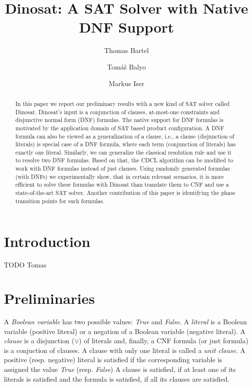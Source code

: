 \documentclass[a4paper,UKenglish,cleveref, autoref, thm-restate]{lipics-v2021}
\title{Dinosat: A SAT Solver with Native DNF Support}
\author{Thomas Bartel}{CAS Software, Karlsruhe, Germany} {thomas.bartel@cas.de}{}{}
\author{Tom\'a\v{s} Balyo}{CAS Software, Karlsruhe, Germany} {tomas.balyo@cas.de}{}{}
\author{Markus Iser}{Karlsruhe Institute of Technology, Karlsruhe, Germany} {markus.iser@kit.de}{}{}
\begin{document}
\maketitle

\begin{abstract}
In this paper we report our preliminary results with a new kind of SAT solver called Dinosat.
Dinosat's input is a conjunction of clauses, at-most-one constraints and disjunctive normal form (DNF) formulas. The native support for DNF formulas is motivated by the application domain of SAT based product configuration. A DNF formula can also be viewed as a generalization of a clause, i.e., a clause (disjunction of literals) is special case of a DNF formula, where each term (conjunction of literals) has exactly one literal. Similarly, we can generalize the classical resolution rule and use it to resolve two DNF formulas. Based on that, the CDCL algorithm can be modified to work with DNF formulas instead of just clauses. Using randomly generated formulas (with DNFs) we experimentally show, that in certain relevant scenarios, it is more efficient to solve these formulas with Dinosat than translate them to CNF and use a state-of-the-art SAT solver. Another contribution of this paper is identifying the phase transition points for such formulas.

\end{abstract}

\section{Introduction}
TODO Tomas

\section{Preliminaries}
A \emph{Boolean variable} has two possible values: \emph{True} and \emph{False}. A \emph{literal} is a Boolean variable (positive literal) or a negation of a Boolean variable (negative literal). A \textit{clause} is a disjunction ($\lor$) of literals and, finally, a CNF formula (or just formula) is a conjuction of clauses.
A clause with only one literal is called a \textit{unit clause}.
A positive (resp. negative) literal is satisfied if the corresponding variable is assigned the value \textit{True} (resp. \textit{False})
A clause is satisfied, if at least one of its literals is satisfied and the formula is satisfied, if all its clauses are satisfied. 
\end{document}

